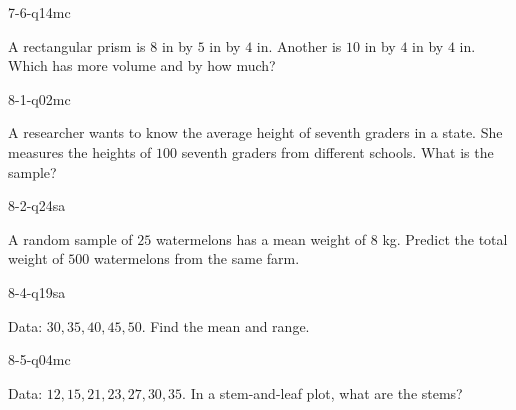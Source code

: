 \begin{practiceQuestion}{7-6-q14}{mc}
\begin{questionText}
A rectangular prism is $8$ in by $5$ in by $4$ in. Another is $10$ in by $4$ in by $4$ in. Which has more volume and by how much?
\end{questionText}
\end{practiceQuestion}

\begin{practiceQuestion}{8-1-q02}{mc}
\begin{questionText}
A researcher wants to know the average height of seventh graders in a state. She measures the heights of $100$ seventh graders from different schools. What is the sample?
\end{questionText}
\end{practiceQuestion}

\begin{practiceQuestion}{8-2-q24}{sa}
\begin{questionText}
A random sample of $25$ watermelons has a mean weight of $8$ kg. Predict the total weight of $500$ watermelons from the same farm.
\end{questionText}
\end{practiceQuestion}

\begin{practiceQuestion}{8-4-q19}{sa}
\begin{questionText}
Data: $30, 35, 40, 45, 50$. Find the mean and range.
\end{questionText}
\end{practiceQuestion}

\begin{practiceQuestion}{8-5-q04}{mc}
\begin{questionText}
Data: $12, 15, 21, 23, 27, 30, 35$. In a stem-and-leaf plot, what are the stems?
\end{questionText}
\end{practiceQuestion}

